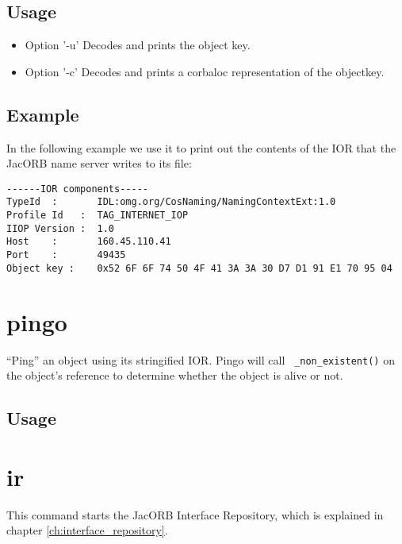 \subsection*{Usage}


\begin{itemize}
\item Option '-u' Decodes and prints the object key.
\item Option '-c' Decodes and prints a corbaloc representation of the objectkey.
\end{itemize}

\subsection*{Example}

In the following example we use it to print out the contents of the
IOR that the JacORB name server writes to its file:

\small{\begin{verbatim}
------IOR components-----
TypeId  :       IDL:omg.org/CosNaming/NamingContextExt:1.0
Profile Id   :  TAG_INTERNET_IOP
IIOP Version :  1.0
Host    :       160.45.110.41
Port    :       49435
Object key :    0x52 6F 6F 74 50 4F 41 3A 3A 30 D7 D1 91 E1 70 95 04
\end{verbatim}
}

\section{pingo}

``Ping'' an object using its stringified IOR. Pingo will call {\tt
  \_non\_existent()} on the object's reference to determine whether
  the object is alive or not.

\subsection*{Usage}


\section{ir}

This command starts the JacORB Interface Repository, which is explained in
chapter \ref{ch:interface_repository}.

